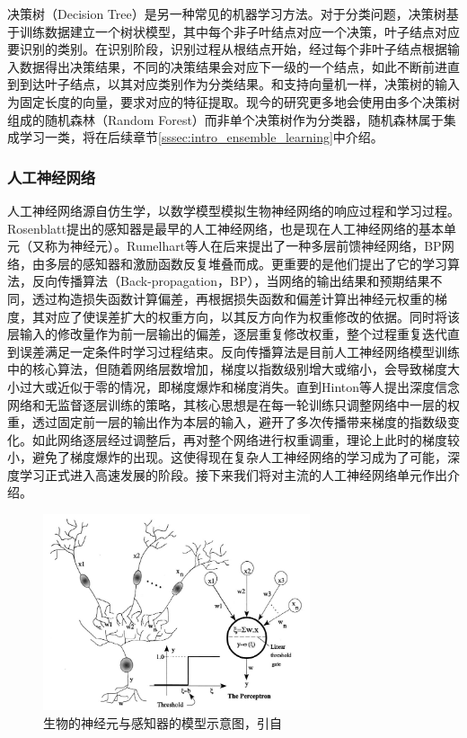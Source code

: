 决策树（Decision Tree）是另一种常见的机器学习方法。对于分类问题，决策树基于训练数据建立一个树状模型，其中每个非子叶结点对应一个决策，叶子结点对应要识别的类别。在识别阶段，识别过程从根结点开始，经过每个非叶子结点根据输入数据得出决策结果，不同的决策结果会对应下一级的一个结点，如此不断前进直到到达叶子结点，以其对应类别作为分类结果。和支持向量机一样，决策树的输入为固定长度的向量，要求对应的特征提取。现今的研究更多地会使用由多个决策树组成的随机森林（Random Forest）而非单个决策树作为分类器，随机森林属于集成学习一类，将在后续章节\ref{sssec:intro_ensemble_learning}中介绍。

\subsubsection{人工神经网络}

人工神经网络源自仿生学，以数学模型模拟生物神经网络的响应过程和学习过程。Rosenblatt提出的感知器\cite{rosenblatt1958perceptron}是最早的人工神经网络，也是现在人工神经网络的基本单元（又称为神经元）。Rumelhart等人\cite{rumelhart1985learning}在后来提出了一种多层前馈神经网络，BP网络，由多层的感知器和激励函数反复堆叠而成。更重要的是他们提出了它的学习算法，反向传播算法（Back-propagation，BP），当网络的输出结果和预期结果不同，透过构造损失函数计算偏差，再根据损失函数和偏差计算出神经元权重的梯度，其对应了使误差扩大的权重方向，以其反方向作为权重修改的依据。同时将该层输入的修改量作为前一层输出的偏差，逐层重复修改权重，整个过程重复迭代直到误差满足一定条件时学习过程结束。反向传播算法是目前人工神经网络模型训练中的核心算法，但随着网络层数增加，梯度以指数级别增大或缩小，会导致梯度大小过大或近似于零的情况，即梯度爆炸和梯度消失。直到Hinton等人\cite{hinton2006fast}提出深度信念网络和无监督逐层训练的策略，其核心思想是在每一轮训练只调整网络中一层的权重，透过固定前一层的输出作为本层的输入，避开了多次传播带来梯度的指数级变化。如此网络逐层经过调整后，再对整个网络进行权重调重，理论上此时的梯度较小，避免了梯度爆炸的出现。这使得现在复杂人工神经网络的学习成为了可能，深度学习正式进入高速发展的阶段。接下来我们将对主流的人工神经网络单元作出介绍。

\begin{figure}[H]
  \centering
  \includegraphics[width=0.7\textwidth]{img/perceptron.png}
  \caption{生物的神经元与感知器的模型示意图，引自\cite{basheer2000artificial}}
  \label{fig:perceptron}
\end{figure}

